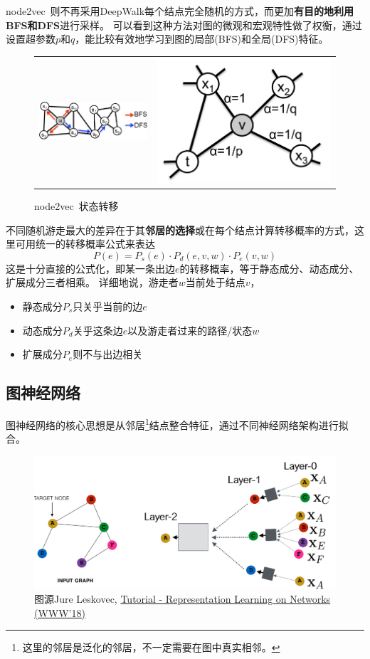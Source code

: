 \documentclass[reportComp]{thesis}
\begin{document}
node2vec~\cite{grover:node2vec_kdd_2016}则不再采用DeepWalk每个结点完全随机的方式，而更加\textbf{有目的地利用BFS和DFS}进行采样。
可以看到这种方法对图的微观和宏观特性做了权衡，通过设置超参数$p$和$q$，能比较有效地学习到图的局部(BFS)和全局(DFS)特征。
\begin{figure}[H]
\centering
\begin{tabular}{cc}
\includegraphics[width=0.6\linewidth]{fig/node2vec.png} &
\includegraphics[width=0.3\linewidth]{fig/node2vec-transition.png}
\end{tabular}
\caption{node2vec~\cite{grover:node2vec_kdd_2016}状态转移}
\end{figure}

不同随机游走最大的差异在于其\textbf{邻居的选择}或在每个结点计算转移概率的方式\cite{yang:knightking_sosp_2019}，这里可用统一的转移概率公式来表达%
\[P(e)=P_s(e)\cdot P_d(e,v,w)\cdot P_e(v,w)\]
这是十分直接的公式化，即某一条出边$e$的转移概率，等于静态成分、动态成分、扩展成分三者相乘。
详细地说，游走者$w$当前处于结点$v$，
\begin{itemize}
	\item 静态成分$P_s$只关乎当前的边$e$
	\item 动态成分$P_d$关乎这条边$e$以及游走者过来的路径/状态$w$%
	\item 扩展成分$P_e$则不与出边相关%
\end{itemize}

\subsection{图神经网络}
图神经网络的核心思想是从邻居\footnote{这里的邻居是泛化的邻居，不一定需要在图中真实相邻。}结点整合特征，通过不同神经网络架构进行拟合。
\begin{figure}[H]
\centering
\includegraphics[width=0.8\linewidth]{fig/grl-layers.png}
\caption{图源Jure Leskovec, \href{http://snap.stanford.edu/proj/embeddings-www/}{Tutorial - Representation Learning on Networks (WWW'18)}}
\end{figure}
\end{document}

